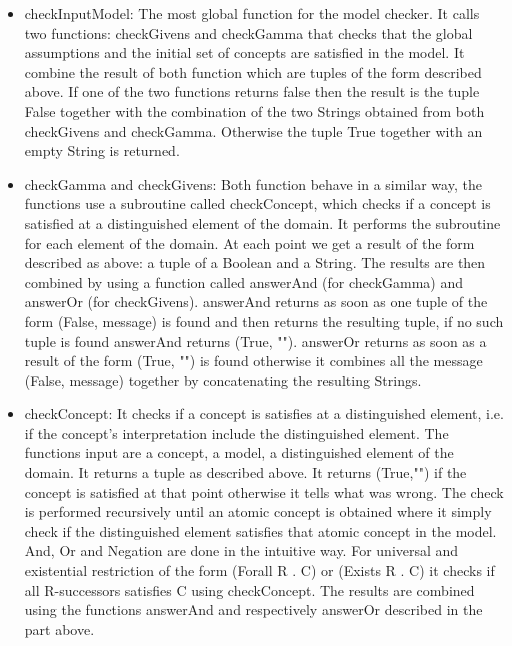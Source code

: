 \begin{itemize}
\item checkInputModel: The most global function for the model checker.
   It calls two functions: checkGivens and checkGamma that checks that
   the global assumptions and the initial set of concepts are satisfied
   in the model. It combine the result of both function which are
   tuples of the form described above. If one of the two functions
   returns false then the result is the tuple False together with the
   combination of the two Strings obtained from both checkGivens and
   checkGamma.  Otherwise the tuple True together with an empty String
   is returned.

\item checkGamma and checkGivens: Both function behave in a similar
   way, the functions use a subroutine called checkConcept, which
   checks if a concept is satisfied at a distinguished element of the
   domain. It performs the subroutine for each element of the
   domain. At each point we get a result of the form described as
   above: a tuple of a Boolean and a String. The results are then
   combined by using a function called answerAnd (for checkGamma) and
   answerOr (for checkGivens). answerAnd returns as soon as one tuple
   of the form (False, message) is found and then returns the resulting
   tuple, if no such tuple is found answerAnd returns (True,
   ""). answerOr returns as soon as a result of the form (True, "") is
   found otherwise it combines all the message (False, message)
   together by concatenating the resulting Strings.

\item checkConcept: It checks if a concept is satisfies at a
   distinguished element, i.e. if the concept's interpretation include
   the distinguished element. The functions input are a concept, a
   model, a distinguished element of the domain. It returns a tuple as
   described above. It returns (True,"") if the concept is satisfied at
   that point otherwise it tells what was wrong. The check is performed
   recursively until an atomic concept is obtained where it simply
   check if the distinguished element satisfies that atomic concept in
   the model. And, Or and Negation are done in the intuitive way. For
   universal and existential restriction of the form (Forall R . C) or
   (Exists R . C) it checks if all R-successors satisfies C using
   checkConcept.  The results are combined using the functions
   answerAnd and respectively answerOr described in the part above.
\end{itemize}

